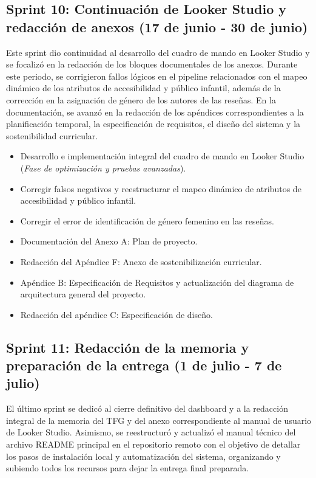 \subsection{Sprint 10: Continuación de Looker Studio y redacción de anexos (17 de junio - 30 de junio)}
Este sprint dio continuidad al desarrollo del cuadro de mando en Looker Studio y se focalizó en la redacción de los bloques documentales de los anexos. Durante este periodo, se corrigieron fallos lógicos en el pipeline relacionados con el mapeo dinámico de los atributos de accesibilidad y público infantil, además de la corrección en la asignación de género de los autores de las reseñas. En la documentación, se avanzó en la redacción de los apéndices correspondientes a la planificación temporal, la especificación de requisitos, el diseño del sistema y la sostenibilidad curricular.

\begin{itemize}
    \item Desarrollo e implementación integral del cuadro de mando en Looker Studio (\textit{Fase de optimización y pruebas avanzadas}).
    \item Corregir falsos negativos y reestructurar el mapeo dinámico de atributos de accesibilidad y público infantil.
    \item Corregir el error de identificación de género femenino en las reseñas.
    \item Documentación del Anexo A: Plan de proyecto.
    \item Redacción del Apéndice F: Anexo de sostenibilización curricular.
    \item Apéndice B:  Especificación de Requisitos y actualización del diagrama de arquitectura general del proyecto.
    \item Redacción del apéndice C: Especificación de diseño.
\end{itemize}

\subsection{Sprint 11: Redacción de la memoria y preparación de la entrega (1 de julio - 7 de julio)}
El último sprint se dedicó al cierre definitivo del dashboard y a la redacción integral de la memoria del TFG y del anexo correspondiente al manual de usuario de Looker Studio. Asimismo, se reestructuró y actualizó el manual técnico del archivo README principal en el repositorio remoto con el objetivo de detallar los pasos de instalación local y automatización del sistema, organizando y subiendo todos los recursos para dejar la entrega final preparada.

